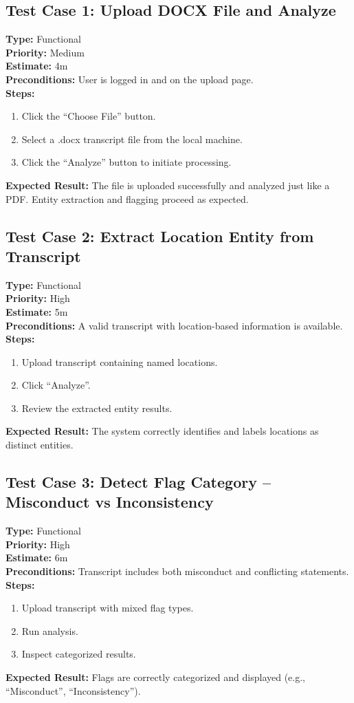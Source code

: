 \documentclass[12pt]{article}
\begin{document}
\subsection*{Test Case 1: Upload DOCX File and Analyze}
\textbf{Type:} Functional \\
\textbf{Priority:} Medium \\
\textbf{Estimate:} 4m \\
\textbf{Preconditions:} User is logged in and on the upload page. \\
\textbf{Steps:}
\begin{enumerate}[label=\arabic*.]
\item Click the “Choose File” button.
\item Select a .docx transcript file from the local machine.
\item Click the “Analyze” button to initiate processing.
\end{enumerate}
\textbf{Expected Result:} The file is uploaded successfully and analyzed just like a PDF. Entity extraction and flagging proceed as expected.

\subsection*{Test Case 2: Extract Location Entity from Transcript}
\textbf{Type:} Functional \\
\textbf{Priority:} High \\
\textbf{Estimate:} 5m \\
\textbf{Preconditions:} A valid transcript with location-based information is available. \\
\textbf{Steps:}
\begin{enumerate}[label=\arabic*.]
\item Upload transcript containing named locations.
\item Click “Analyze”.
\item Review the extracted entity results.
\end{enumerate}
\textbf{Expected Result:} The system correctly identifies and labels locations as distinct entities.

\subsection*{Test Case 3: Detect Flag Category – Misconduct vs Inconsistency}
\textbf{Type:} Functional \\
\textbf{Priority:} High \\
\textbf{Estimate:} 6m \\
\textbf{Preconditions:} Transcript includes both misconduct and conflicting statements. \\
\textbf{Steps:}
\begin{enumerate}[label=\arabic*.]
\item Upload transcript with mixed flag types.
\item Run analysis.
\item Inspect categorized results.
\end{enumerate}
\textbf{Expected Result:} Flags are correctly categorized and displayed (e.g., “Misconduct”, “Inconsistency”).
\end{document}
